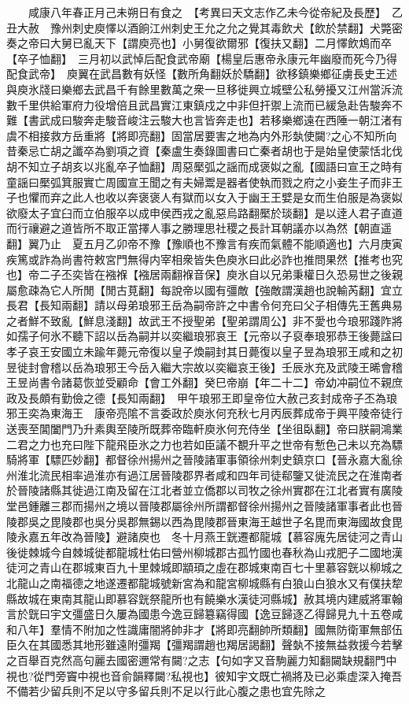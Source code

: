 　　咸康八年春正月己未朔日有食之　【考異曰天文志作乙未今從帝紀及長歷】　乙丑大赦　豫州刺史庾懌以酒餉江州刺史王允之允之覺其毒飲犬【飲於禁翻】犬斃密奏之帝曰大舅已亂天下【謂庾亮也】小舅復欲爾邪【復扶又翻】二月懌飲鴆而卒【卒子恤翻】　三月初以武悼后配食武帝廟【楊皇后惠帝永康元年幽廢而死今乃得配食武帝】　庾翼在武昌數有妖怪【數所角翻妖於驕翻】欲移鎮樂鄉征虜長史王述與庾氷牋曰樂鄉去武昌千有餘里數萬之衆一旦移徙興立城壁公私勞擾又江州當泝流數千里供給軍府力役增倍且武昌實江東鎮戍之中非但扞禦上流而已緩急赴告駿奔不難【書武成曰駿奔走駿音峻注云駿大也言皆奔走也】若移樂鄉遠在西陲一朝江渚有虞不相接救方岳重將【將即亮翻】固當居要害之地為内外形埶使闚?之心不知所向昔秦忌亡胡之讖卒為劉項之資【秦盧生奏錄圖書曰亡秦者胡也于是始皇使蒙恬北伐胡不知立子胡亥以兆亂卒子恤翻】周惡檿弧之謡而成褒姒之亂【國語曰宣王之時有童謡曰檿弧箕服實亡周國宣王聞之有夫婦鬻是器者使執而戮之府之小妾生子而非王子也懼而弃之此人也收以奔褒褒人有獄而以女入于幽王王嬖是女而生伯服是為褒姒欲廢太子宜臼而立伯服卒以成申侯西戎之亂惡烏路翻檿於琰翻】是以逹人君子直道而行禳避之道皆所不取正當擇人事之勝理思社稷之長計耳朝議亦以為然【朝直遥翻】翼乃止　夏五月乙卯帝不豫【豫順也不豫言有疾而氣體不能順適也】六月庚寅疾篤或詐為尚書符敕宮門無得内宰相衆皆失色庾氷曰此必詐也推問果然【推考也究也】帝二子丕奕皆在襁褓【襁居兩翻褓音保】庾氷自以兄弟秉權日久恐易世之後親屬愈疎為它人所閒【閒古莧翻】每說帝以國有彊敵【強敵謂漢趙也說輸芮翻】宜立長君【長知兩翻】請以母弟琅邪王岳為嗣帝許之中書令何充曰父子相傳先王舊典易之者鮮不致亂【鮮息淺翻】故武王不授聖弟【聖弟謂周公】非不愛也今琅邪踐阼將如孺子何氷不聽下詔以岳為嗣并以奕繼琅邪哀王【元帝以子裒奉琅邪恭王後薨諡曰孝子哀王安國立未踰年薨元帝復以皇子煥嗣封其日薨復以皇子昱為琅邪王咸和之初昱徙封會稽以岳為琅邪王今岳入繼大宗故以奕繼哀王後】壬辰氷充及武陵王晞會稽王昱尚書令諸葛恢並受顧命【會工外翻】癸巳帝崩【年二十二】帝幼冲嗣位不親庶政及長頗有勤儉之德【長知兩翻】　甲午琅邪王即皇帝位大赦己亥封成帝子丕為琅邪王奕為東海王　康帝亮隂不言委政於庾氷何充秋七月丙辰葬成帝于興平陵帝徒行送喪至閶闔門乃升素輿至陵所既葬帝臨軒庾氷何充侍坐【坐徂臥翻】帝曰朕嗣鴻業二君之力也充曰陛下龍飛臣氷之力也若如臣議不覩升平之世帝有慙色己未以充為驃騎將軍【驃匹妙翻】都督徐州揚州之晉陵諸軍事領徐州刺史鎮京口【晉永嘉大亂徐州淮北流民相率過淮亦有過江居晉陵郡界者咸和四年司徒郗鑒又徙流民之在淮南者於晉陵諸縣其徙過江南及留在江北者並立僑郡以司牧之徐州實郡在江北者實有廣陵堂邑鍾離三郡而揚州之境以晉陵郡屬徐州所謂都督徐州揚州之晉陵諸軍事者此也晉陵郡吳之毘陵郡也吳分吳郡無錫以西為毘陵郡晉東海王越世子名毘而東海國故食毘陵永嘉五年改為晉陵】避諸庾也　冬十月燕王皝遷都龍城【慕容廆先居徒河之青山後徙棘城今自棘城徙都龍城杜佑曰營州柳城郡古孤竹國也春秋為山戎肥子二國地漢徒河之青山在郡城東百九十里棘城即顓頊之虛在郡城東南百七十里慕容皝以柳城之北龍山之南福德之地遂遷都龍城號新宮為和龍宮柳城縣有白狼山白狼水又有僕扶犂縣故城在東南其龍山即慕容皝祭龍所也有饒樂水漢徒河縣城】赦其境内建威將軍翰言於皝曰宇文彊盛日久屢為國患今逸豆歸簒竊得國【逸豆歸逐乙得歸見九十五卷咸和八年】羣情不附加之性識庸闇將帥非才【將即亮翻帥所類翻】國無防衛軍無部伍臣久在其國悉其地形雖遠附彊羯【彊羯謂趙也羯居謁翻】聲埶不接無益救援今若擊之百舉百克然高句麗去國密邇常有闚?之志【句如字又音駒麗力知翻闚缺規翻門中視也?從門旁竇中視也音俞韻釋闚?私視也】彼知宇文既亡禍將及已必乘虚深入掩吾不備若少留兵則不足以守多留兵則不足以行此心腹之患也宜先除之